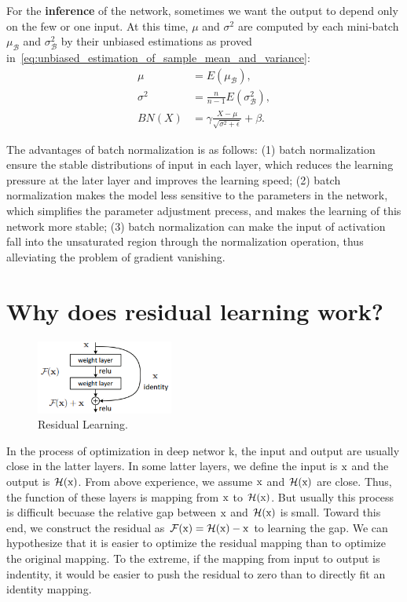 \documentclass[10pt,onecolumn]{book}
\begin{document}
For the \textbf{inference} of the network, sometimes we want the output to depend only on the few or one input. At this time, $\mu$ and $\sigma^2$ are computed by each mini-batch $\mu_\mathcal{B}$ and $\sigma^2_\mathcal{B}$ by their unbiased estimations as proved in~\ref{eq:unbiased_estimation_of_sample_mean_and_variance}:
\begin{equation}
\begin{split}
\mu &= E(\mu_\mathcal{B}), \\
\sigma^2 &= \frac{n}{n-1}E(\sigma^2_\mathcal{B}), \\
BN(X) & = \gamma \frac{X - \mu}{\sqrt{\sigma^2 + \epsilon}} + \beta.
\end{split}
\end{equation}

The advantages of batch normalization is as follows: (1) batch normalization ensure the stable distributions of input in each layer, which reduces the learning pressure at the later layer and improves the learning speed; (2) batch normalization makes the model less sensitive to the parameters in the network, which simplifies the parameter adjustment precess, and makes the learning of this network more stable; (3) batch normalization can make the input of activation fall into the unsaturated region through the normalization operation, thus alleviating the problem of gradient vanishing.

\section{Why does residual learning work?}

\begin{figure}[h]
\centering
\includegraphics[width=0.4\textwidth]{figures/residual_learning_block.png}
\caption{Residual Learning.}
\end{figure}

In the process of optimization in deep networ
k, the input and output are usually close in the latter layers. In some latter layers, we define the input is $\rm{x}$ and the output is $\mathcal{H(\rm{x})}$. From above experience, we assume $\rm{x}$ and $\mathcal{H(\rm{x})}$ are close. Thus, the function of these layers is mapping from $\rm{x}$ to $\mathcal{H(\rm{x})}$. But usually this process is difficult becuase the relative gap between $\rm{x}$ and $\mathcal{H(\rm{x})}$ is small. Toward this end, we construct the residual as \uline{$\mathcal{F(\rm{x})} = \mathcal{H(\rm{x})} - \rm{x}$} to learning the gap. We can hypothesize that it is easier to optimize the residual mapping than to optimize the original mapping. To the extreme, if the mapping from input to output is indentity, it would be easier to push the residual to zero than to directly fit an identity mapping.
\end{document}
